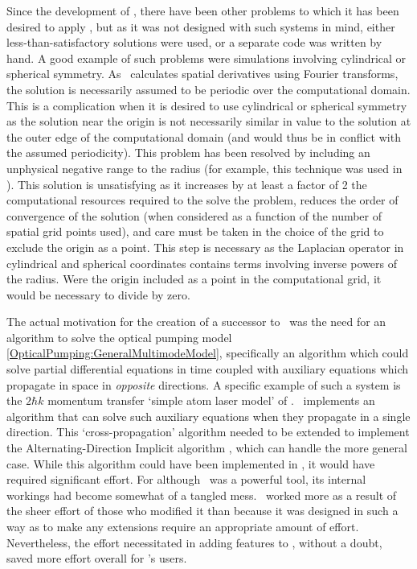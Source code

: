 Since the development of \XMDS, there have been other problems to which it has been desired to apply \XMDS, but as it was not designed with such systems in mind, either less-than-satisfactory solutions were used, or a separate code was written by hand.  A good example of such problems were simulations involving cylindrical or spherical symmetry.  As \XMDS\ calculates spatial derivatives using Fourier transforms, the solution is necessarily assumed to be periodic over the computational domain.  This is a complication when it is desired to use cylindrical or spherical symmetry as the solution near the origin is not necessarily similar in value to the solution at the outer edge of the computational domain (and would thus be in conflict with the assumed periodicity).  This problem has been resolved by including an unphysical negative range to the radius (for example, this technique was used in \citep{Wuster:2005,Dall:2009}).  This solution is unsatisfying as it increases by at least a factor of 2 the computational resources required to the solve the problem, reduces the order of convergence of the solution (when considered as a function of the number of spatial grid points used), and care must be taken in the choice of the grid to exclude the origin as a point.  This step is necessary as the Laplacian operator in cylindrical and spherical coordinates contains terms involving inverse powers of the radius.  Were the origin included as a point in the computational grid, it would be necessary to divide by zero.

The actual motivation for the creation of a successor to \XMDS\ was the need for an algorithm to solve the optical pumping model \eqref{OpticalPumping:GeneralMultimodeModel}, specifically an algorithm which could solve partial differential equations in time coupled with auxiliary equations which propagate in space in \emph{opposite} directions.  A specific example of such a system is the $2 \hbar k$ momentum transfer `simple atom laser model' of .  \XMDS\ implements an algorithm that can solve such auxiliary equations when they propagate in a single direction.  This `cross-propagation' algorithm needed to be extended to implement the Alternating-Direction Implicit algorithm \citep{NumericalRecipes}, which can handle the more general case.  While this algorithm could have been implemented in \XMDS, it would have required significant effort.  For although \XMDS\ was a powerful tool, its internal workings had become somewhat of a tangled mess.  \XMDS\ worked more as a result of the sheer effort of those who modified it than because it was designed in such a way as to make any extensions require an appropriate amount of effort.  Nevertheless, the effort necessitated in adding features to \XMDS, without a doubt, saved more effort overall for \XMDS's users.  

